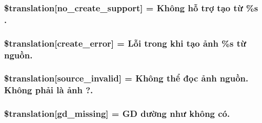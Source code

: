 \subsubsection[{\$translation}]{\setlength{\rightskip}{0pt plus 5cm}\$translation\mbox{[}\textquotesingle{}no\+\_\+create\+\_\+support\textquotesingle{}\mbox{]} = \textquotesingle{}Không hỗ trợ tạo từ \%s .\textquotesingle{}}\label{class_8upload_8vn___v_n_8php_a346dfd1ade29f583dd20d345c436859f}
\hypertarget{class_8upload_8vn___v_n_8php_a53013ce9255c4e1849098ddd9fdb2b3f}{}
\subsubsection[{\$translation}]{\setlength{\rightskip}{0pt plus 5cm}\$translation\mbox{[}\textquotesingle{}create\+\_\+error\textquotesingle{}\mbox{]} = \textquotesingle{}Lỗi trong khi tạo ảnh \%s từ nguồn.\textquotesingle{}}\label{class_8upload_8vn___v_n_8php_a53013ce9255c4e1849098ddd9fdb2b3f}
\hypertarget{class_8upload_8vn___v_n_8php_a6ab0a660b457eaf2d3434b225449fdd6}{}
\subsubsection[{\$translation}]{\setlength{\rightskip}{0pt plus 5cm}\$translation\mbox{[}\textquotesingle{}source\+\_\+invalid\textquotesingle{}\mbox{]} = \textquotesingle{}Không thể đọc ảnh nguồn. Không phải là ảnh ?.\textquotesingle{}}\label{class_8upload_8vn___v_n_8php_a6ab0a660b457eaf2d3434b225449fdd6}
\hypertarget{class_8upload_8vn___v_n_8php_a7f3dfcc0db4bbc0f2e7210c439798e56}{}
\subsubsection[{\$translation}]{\setlength{\rightskip}{0pt plus 5cm}\$translation\mbox{[}\textquotesingle{}gd\+\_\+missing\textquotesingle{}\mbox{]} = \textquotesingle{}G\+D dường như không có.\textquotesingle{}}\label{class_8upload_8vn___v_n_8php_a7f3dfcc0db4bbc0f2e7210c439798e56}
\hypertarget{class_8upload_8vn___v_n_8php_a82d5853430ab72dc1f9799ec36144cc6}{}
